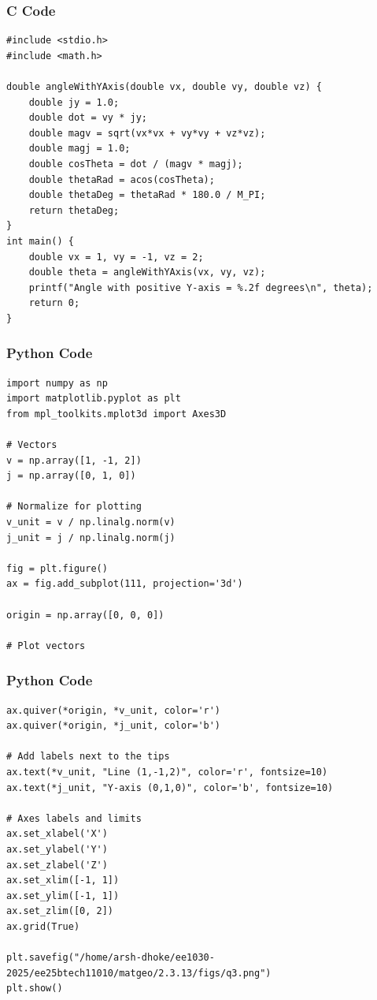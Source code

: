 \documentclass{beamer}
\begin{document}
\begin{frame}[fragile]
    \frametitle{C Code}
\begin{lstlisting}
#include <stdio.h>
#include <math.h>

double angleWithYAxis(double vx, double vy, double vz) {
    double jy = 1.0;
    double dot = vy * jy;
    double magv = sqrt(vx*vx + vy*vy + vz*vz);
    double magj = 1.0;
    double cosTheta = dot / (magv * magj);
    double thetaRad = acos(cosTheta);
    double thetaDeg = thetaRad * 180.0 / M_PI;
    return thetaDeg;
}
int main() {
    double vx = 1, vy = -1, vz = 2;
    double theta = angleWithYAxis(vx, vy, vz);
    printf("Angle with positive Y-axis = %.2f degrees\n", theta);
    return 0;
}
\end{lstlisting}
\end{frame}

\begin{frame}[fragile]
    \frametitle{Python Code}
\begin{lstlisting}
import numpy as np
import matplotlib.pyplot as plt
from mpl_toolkits.mplot3d import Axes3D

# Vectors
v = np.array([1, -1, 2])
j = np.array([0, 1, 0])

# Normalize for plotting
v_unit = v / np.linalg.norm(v)
j_unit = j / np.linalg.norm(j)

fig = plt.figure()
ax = fig.add_subplot(111, projection='3d')

origin = np.array([0, 0, 0])

# Plot vectors
\end{lstlisting}
\end{frame}

\begin{frame}[fragile]
    \frametitle{Python Code}
\begin{lstlisting}
ax.quiver(*origin, *v_unit, color='r')
ax.quiver(*origin, *j_unit, color='b')

# Add labels next to the tips
ax.text(*v_unit, "Line (1,-1,2)", color='r', fontsize=10)
ax.text(*j_unit, "Y-axis (0,1,0)", color='b', fontsize=10)

# Axes labels and limits
ax.set_xlabel('X')
ax.set_ylabel('Y')
ax.set_zlabel('Z')
ax.set_xlim([-1, 1])
ax.set_ylim([-1, 1])
ax.set_zlim([0, 2])
ax.grid(True)

plt.savefig("/home/arsh-dhoke/ee1030-2025/ee25btech11010/matgeo/2.3.13/figs/q3.png")
plt.show()

\end{lstlisting}
\end{frame}
\end{document}

